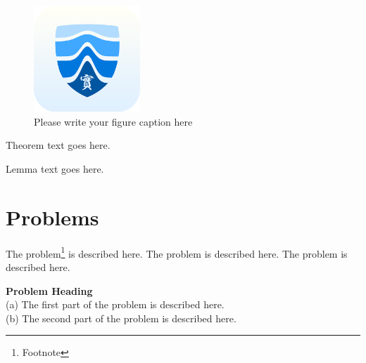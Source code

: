 %
%
\begin{figure}
\centering
\includegraphics[height=4cm]{wanmenlogo.png}
%
%
\caption{Please write your figure caption here}
\label{fig:1.1}       %
\end{figure}
%
%
\begin{theorem}
Theorem text goes here.
\end{theorem}
%
%
\begin{lemma}
Lemma text goes here.
\end{lemma}
%
%
\section*{Problems}
%
\begin{prob}
\label{prob:1.1}
The problem\footnote{Footnote} is described here. The
problem is described here. The problem is described here.
\end{prob}

\begin{prob}
\label{prob:1.2}
\textbf{Problem Heading}\\
(a) The first part of the problem is described here.\\
(b) The second part of the problem is described here.
\end{prob}